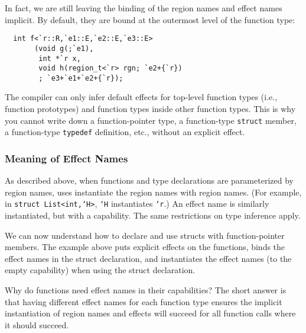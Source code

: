In fact, we are still leaving the binding of the region names and
effect names implicit.  By default, they are bound at the outermost
level of the function type:
\begin{verbatim}
  int f<`r::R,`e1::E,`e2::E,`e3::E>
       (void g(;`e1), 
        int *`r x, 
        void h(region_t<`r> rgn; `e2+{`r})
        ; `e3+`e1+`e2+{`r});
\end{verbatim}

The compiler can only infer default effects for top-level function
types (i.e., function prototypes) and function types inside other
function types.  This is why you cannot write down a function-pointer
type, a function-type \texttt{struct} member, a function-type
\texttt{typedef} definition, etc., without an explicit effect.

\subsubsection{Meaning of Effect Names}

As described above, when functions and type declarations are
parameterized by region names, uses instantiate the region names with
region names.  (For example, in \texttt{struct List<int,`H>}, \texttt{`H}
instantiates \texttt{`r}.)  An effect name is similarly instantiated,
but with a capability.  The same restrictions on type inference apply.

We can now understand how to declare and use structs with
function-pointer members.  The example above puts explicit effects on
the functions, binds the effect names in the struct declaration, and
instantiates the effect names (to the empty capability) when using the
struct declaration.

Why do functions need effect names in their capabilities?  The short
answer is that having different effect names for each function type
ensures the implicit instantiation of region names and effects will
succeed for all function calls where it should succeed.

